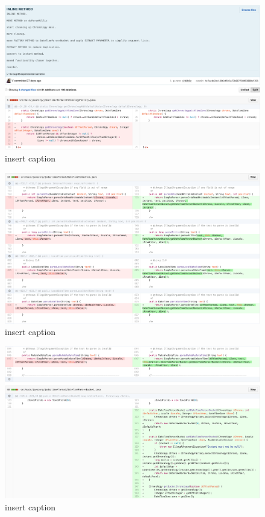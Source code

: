 \begin{figure}[H]
	\centering
	\includegraphics[width=\linewidth]{code76}
	\caption{insert caption}
\end{figure}
\begin{figure}[H]
	\centering
	\includegraphics[width=\linewidth]{code77}
	\caption{insert caption}
\end{figure}
\begin{figure}[H]
	\centering
	\includegraphics[width=\linewidth]{code78}
	\caption{insert caption}
\end{figure}
